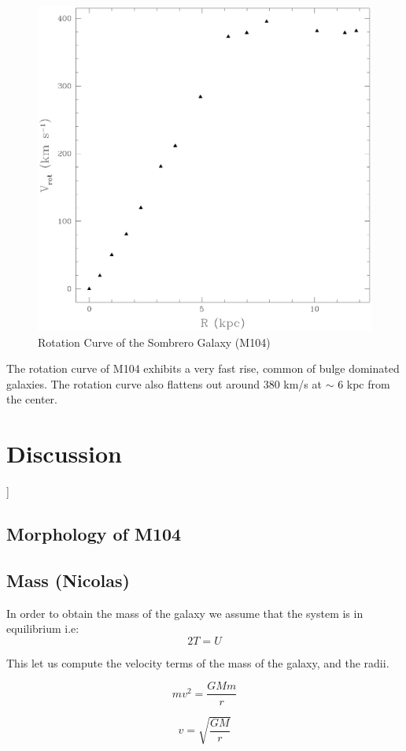 \documentclass[12pt]{article}
\begin{document}
\begin{figure}
\includegraphics[scale=0.4]{rotcrv.eps}
\caption{Rotation Curve of the Sombrero Galaxy (M104)}
\end{figure}

The rotation curve of M104 exhibits a very fast rise, common of bulge
dominated galaxies. The rotation curve also flattens out around 380
km/s at $\sim$ 6 kpc from the center. 

\section{Discussion}
]
\subsection{Morphology of M104}

\subsection{Mass (Nicolas)}

In order to obtain the mass of the galaxy we assume that the system 
is in equilibrium i.e:
\begin{equation}
2T = U
\end{equation}

This let us compute the velocity terms of the mass of the galaxy, and the radii.

\begin{equation}
mv^{2} = \dfrac{GMm}{r}
\end{equation}

\begin{equation}
v = \sqrt{\dfrac{GM}{r}}
\end{equation}
\end{document}
